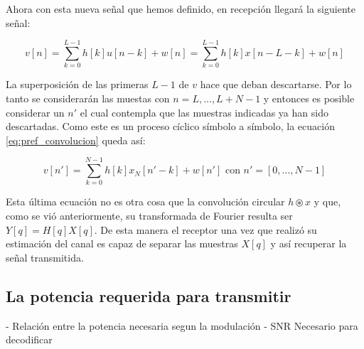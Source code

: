 Ahora con esta nueva señal que hemos definido, en recepción llegará la siguiente señal:

\begin{equation}\label{eq:pref_convolucion}
v[n] = \sum_{k = 0}^{L-1}h[k]u[n-k] + w[n] = \sum_{k = 0}^{L-1}h[k]x[n-L-k] + w[n]
\end{equation}

La superposición de las primeras $L-1$ de $v$ hace que deban descartarse. Por lo tanto se considerarán las muestas con $n = L,..., L+N-1$ y entonces es posible considerar un $n'$ el cual contempla que las muestras indicadas ya han sido descartadas. Como este es un proceso cíclico símbolo a símbolo, la ecuación \ref{eq:pref_convolucion} queda así: 

\begin{equation}
v[n'] = \sum_{k = 0}^{N-1}h[k]x_N[n'- k] + w[n'] \text{ con } n' = [0, ..., N-1]
\end{equation}

Esta última ecuación no es otra cosa que la convolución circular $h \circledast x$ y que, como se vió anteriormente, su transformada de Fourier resulta ser $Y[q] = H[q]X[q]$.
De esta manera el receptor una vez que realizó su estimación del canal es capaz de separar las muestras $X[q]$ y así recuperar la señal transmitida.

\subsection{La potencia requerida para transmitir}
- Relación entre la potencia necesaria segun la modulación
- SNR Necesario para decodificar
